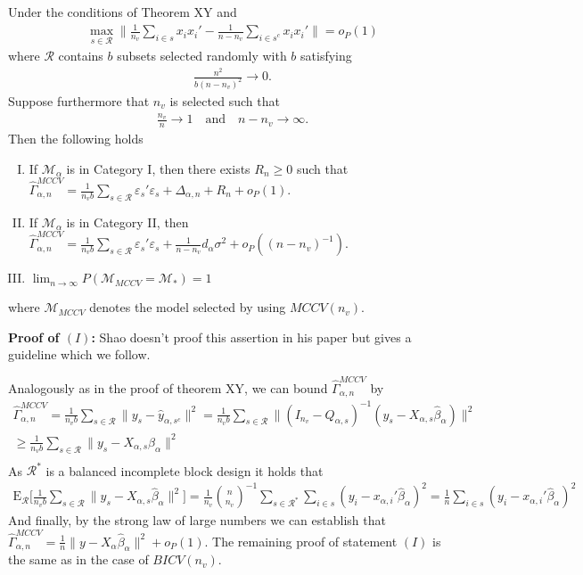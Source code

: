 \documentclass[Research_Module_ES.tex]{subfiles}
\begin{document}
\begin{satz}
Under the conditions of Theorem XY and
\begin{align*}
\max_{s\in \mathcal{R}}\biggl\lVert \frac{1}{n_v}\sum_{i\in s}x_ix_i' - \frac{1}{n-n_v}\sum_{i\in s^c}x_ix_i'\biggr\rVert =o_P(1)
\end{align*}
where $\mathcal{R}$ contains $b$ subsets selected randomly with $b$ satisfying
\begin{align*}
\frac{n^2}{b(n-n_v)^2}\to 0.
\end{align*}
Suppose furthermore that $n_v$ is selected such that
\begin{align*}
\frac{n_v}{n}\to 1 \quad \textrm{and} \quad n-n_v \to \infty.
\end{align*}
Then the following holds
\begin{enumerate}[(I)]
\item If $\mathcal{M}_\alpha$ is in Category I, then there exists $R_n \ge 0$ such that $\hat{\Gamma}_{\alpha,n}^{MCCV} = \frac{1}{n_vb}\sum_{s\in \mathcal{R}}\varepsilon_s'\varepsilon_s + \Delta_{\alpha,n} + R_n + o_P(1)$.
\item If $\mathcal{M}_\alpha$ is in Category II, then $\hat{\Gamma}_{\alpha,n}^{MCCV} = \frac{1}{n_vb}\sum_{s\in \mathcal{R}}\varepsilon_s'\varepsilon_s + \frac{1}{n-n_v}d_\alpha\sigma^2  + o_P((n-n_v)^{-1})$.
\item $\lim_{n\to\infty}P(\mathcal{M}_{MCCV}=\mathcal{M}_\ast) = 1$
\end{enumerate}
where $\mathcal{M}_{MCCV}$ denotes the model selected by using $MCCV(n_v)$.
\end{satz}

\textbf{Proof of $(I)$:} 
Shao doesn't proof this assertion in his paper but gives a guideline which we follow.

Analogously as in the proof of theorem XY, we can bound $\hat{\Gamma}_{\alpha,n}^{MCCV}$ by
\begin{align*}
\hat{\Gamma}_{\alpha,n}^{MCCV}= \frac{1}{n_vb}\sum_{s\in \mathcal{R}}\lVert y_s-\hat{y}_{\alpha,s^c}\rVert^2
= \frac{1}{n_vb}\sum_{s\in \mathcal{R}}\lVert (I_{n_v}-Q_{\alpha,s})^{-1}(y_s-X_{\alpha,s}\hat{\beta}_\alpha)\rVert^2\\
\ge \frac{1}{n_vb}\sum_{s\in \mathcal{R}}\lVert y_s-X_{\alpha,s}\hat{\beta}_\alpha\rVert^2\\
\end{align*}
As $\mathcal{R}^\ast$ is a balanced incomplete block design it holds that
\begin{align*}
\mathrm{E}_\mathcal{R} \biggl[\frac{1}{n_vb}\sum_{s\in \mathcal{R}}\lVert y_s-X_{\alpha,s}\hat{\beta}_\alpha\rVert^2 \biggr] 
= \frac{1}{n_v}\binom{n}{n_v}^{-1}\sum_{s\in \mathcal{R}^\ast}\sum_{i\in s}(y_i-x_{\alpha,i}'\hat{\beta}_\alpha)^2
= \frac{1}{n}\sum_{i\in s}(y_i-x_{\alpha,i}'\hat{\beta}_\alpha)^2
\end{align*}
And finally, by the strong law of large numbers 
we can establish that $\hat{\Gamma}_{\alpha,n}^{MCCV} = \frac{1}{n}\lVert y-X_{\alpha}\hat{\beta}_\alpha\rVert^2 + o_P(1)$. The remaining proof of statement $(I)$ is the same as in the case of $BICV(n_v)$.
\end{document}
